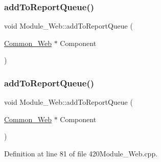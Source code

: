 \subsubsection{\texorpdfstring{add\+To\+Report\+Queue()}{addToReportQueue()}\hspace{0.1cm}{\footnotesize\ttfamily [1/2]}}
{\footnotesize\ttfamily void Module\+\_\+\+Web\+::add\+To\+Report\+Queue (\begin{DoxyParamCaption}\item[{\hyperlink{class_common___web}{Common\+\_\+\+Web} $\ast$}]{Component }\end{DoxyParamCaption})}

\mbox{\label{class_module___web_a9b1a806569076aa701e961d54f888447}} 
\subsubsection{\texorpdfstring{add\+To\+Report\+Queue()}{addToReportQueue()}\hspace{0.1cm}{\footnotesize\ttfamily [2/2]}}
{\footnotesize\ttfamily void Module\+\_\+\+Web\+::add\+To\+Report\+Queue (\begin{DoxyParamCaption}\item[{\hyperlink{class_common___web}{Common\+\_\+\+Web} $\ast$}]{Component }\end{DoxyParamCaption})}



Definition at line 81 of file 420\+Module\+\_\+\+Web.\+cpp.

